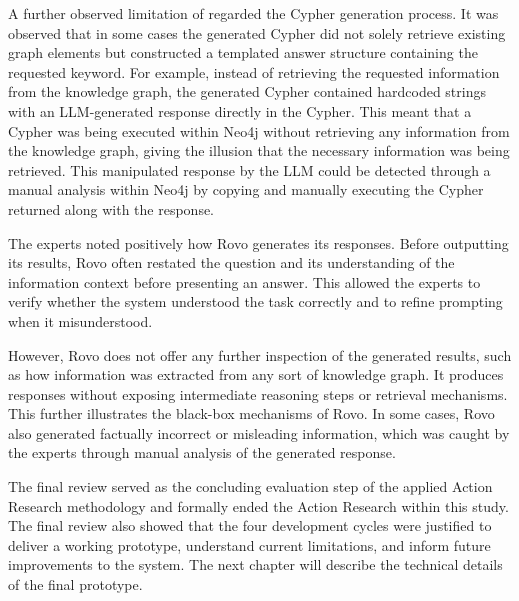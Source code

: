 A further observed limitation of \prototype{} regarded the Cypher generation process. It was observed that in some cases the generated Cypher did not solely retrieve existing graph elements but constructed a templated answer structure containing the requested keyword. For example, instead of retrieving the requested information from the knowledge graph, the generated Cypher contained hardcoded strings with an LLM-generated response directly in the Cypher. This meant that a Cypher was being executed within Neo4j without retrieving any information from the knowledge graph, giving the illusion that the necessary information was being retrieved. This manipulated response by the LLM could be detected through a manual analysis within Neo4j by copying and manually executing the Cypher returned along with the response. %

The experts noted positively how Rovo generates its responses. Before outputting its results, Rovo often restated the question and its understanding of the information context before presenting an answer. This allowed the experts to verify whether the system understood the task correctly and to refine prompting when it misunderstood. %

However, Rovo does not offer any further inspection of the generated results, such as how information was extracted from any sort of knowledge graph. It produces responses without exposing intermediate reasoning steps or retrieval mechanisms. This further illustrates the black-box mechanisms of Rovo. In some cases, Rovo also generated factually incorrect or misleading information, which was caught by the experts through manual analysis of the generated response. %

The final review served as the concluding evaluation step of the applied Action Research methodology and formally ended the Action Research within this study. The final review also showed that the four development cycles were justified to deliver a working prototype, understand current limitations, and inform future improvements to the system. The next chapter will describe the technical details of the final prototype.




